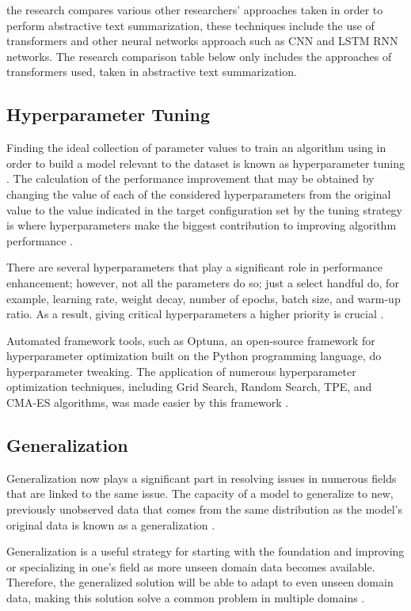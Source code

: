 \documentclass[conference]{IEEEtran}
\begin{document}
\cite{etemad_abidi_chhabra_2021} the research compares various other researchers' approaches taken in order to perform abstractive text summarization, these techniques include the use of transformers and other neural networks approach such as CNN and LSTM RNN networks. The research comparison table below only includes the approaches of transformers used, taken in abstractive text summarization.

\subsection{Hyperparameter Tuning}
Finding the ideal collection of parameter values to train an algorithm using in order to build a model relevant to the dataset is known as hyperparameter tuning \cite{liu_wang_2021}. The calculation of the performance improvement that may be obtained by changing the value of each of the considered hyperparameters from the original value to the value indicated in the target configuration set by the tuning strategy is where hyperparameters make the biggest contribution to improving algorithm performance \cite{joy_selvan_2022}. 

There are several hyperparameters that play a significant role in performance enhancement; however, not all the parameters do so; just a select handful do, for example, learning rate, weight decay, number of epochs, batch size, and warm-up ratio. As a result, giving critical hyperparameters a higher priority is crucial \cite{engdahl_2008}.

Automated framework tools, such as Optuna, an open-source framework for hyperparameter optimization built on the Python programming language, do hyperparameter tweaking. The application of numerous hyperparameter optimization techniques, including Grid Search, Random Search, TPE, and CMA-ES algorithms, was made easier by this framework \cite{joy_selvan_2022}.

\subsection{Generalization}
Generalization now plays a significant part in resolving issues in numerous fields that are linked to the same issue. The capacity of a model to generalize to new, previously unobserved data that comes from the same distribution as the model's original data is known as a generalization \cite{etemad_abidi_chhabra_2021}. 

Generalization is a useful strategy for starting with the foundation and improving or specializing in one's field as more unseen domain data becomes available. Therefore, the generalized solution will be able to adapt to even unseen domain data, making this solution solve a common problem in multiple domains \cite{Zhou_2021}.
\end{document}
